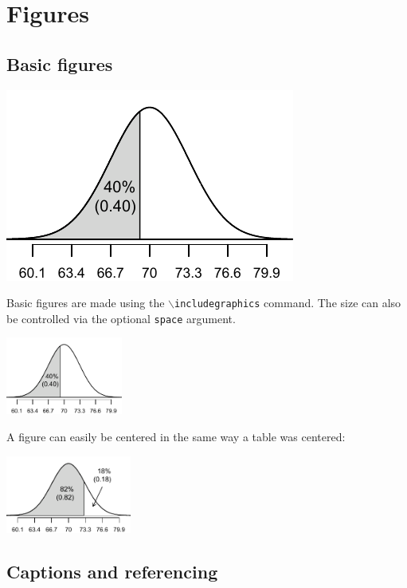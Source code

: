 \documentclass[11pt]{article} %
\begin{document}
\section{Figures}

\subsection{Basic figures}

\includegraphics{lower40} %

Basic figures are made using the \texttt{$\backslash$includegraphics} command. The size can also be controlled via the optional \texttt{space} argument.

\includegraphics[height=1.0in]{lower40} %

A figure can easily be centered in the same way a table was centered:
\begin{center}
\includegraphics[height=1.0in]{figures/lower82/lower82}
\end{center}

\subsection{Captions and referencing}
\end{document}
